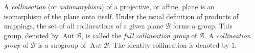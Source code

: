 A \textit{collineation} (or \textit{automorphism}) of a projective, or affine, plane is an isomorphism of the plane onto itself. Under the usual definition of products of mappings, the set of all collineations of a given plane $\mathcal{B}$ forms a group. This group, denoted by $\operatorname{Aut}\mathcal{B}$, is called the \textit{full collineation group} of $\mathcal{B}$. A \textit{collineation group} of $\mathcal{B}$ is a subgroup of $\operatorname{Aut}\mathcal{B}$. The identity collineation is denoted by $1$.
